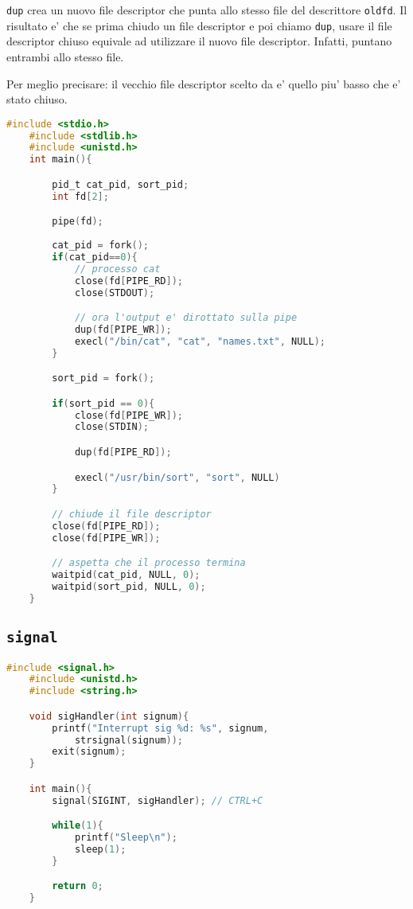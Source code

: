 \texttt{dup} crea un nuovo file descriptor che punta allo 
stesso file del descrittore \texttt{oldfd}. Il risultato e' che
se prima chiudo un file descriptor e poi chiamo \texttt{dup}, 
usare il file descriptor chiuso equivale ad utilizzare il nuovo file descriptor.
Infatti, puntano entrambi allo stesso file.

Per meglio precisare: il vecchio file descriptor scelto da  e' quello 
piu' basso che e' stato chiuso.

\begin{lstlisting}[language=c]
    #include <stdio.h> 
    #include <stdlib.h>
    #include <unistd.h> 
    int main(){

        pid_t cat_pid, sort_pid;
        int fd[2];

        pipe(fd);
        
        cat_pid = fork();
        if(cat_pid==0){
            // processo cat
            close(fd[PIPE_RD]);
            close(STDOUT);

            // ora l'output e' dirottato sulla pipe
            dup(fd[PIPE_WR]);
            execl("/bin/cat", "cat", "names.txt", NULL);
        }

        sort_pid = fork();

        if(sort_pid == 0){
            close(fd[PIPE_WR]);
            close(STDIN);

            dup(fd[PIPE_RD]);

            execl("/usr/bin/sort", "sort", NULL)
        }

        // chiude il file descriptor
        close(fd[PIPE_RD]);
        close(fd[PIPE_WR]);

        // aspetta che il processo termina
        waitpid(cat_pid, NULL, 0);
        waitpid(sort_pid, NULL, 0);
    }
\end{lstlisting}

\subsection{\texttt{signal}}
\begin{lstlisting}[language=c]
    #include <signal.h>
    #include <unistd.h>
    #include <string.h>

    void sigHandler(int signum){
        printf("Interrupt sig %d: %s", signum, 
            strsignal(signum));
        exit(signum);
    }

    int main(){
        signal(SIGINT, sigHandler); // CTRL+C

        while(1){
            printf("Sleep\n");
            sleep(1);
        }

        return 0;
    }
\end{lstlisting}

